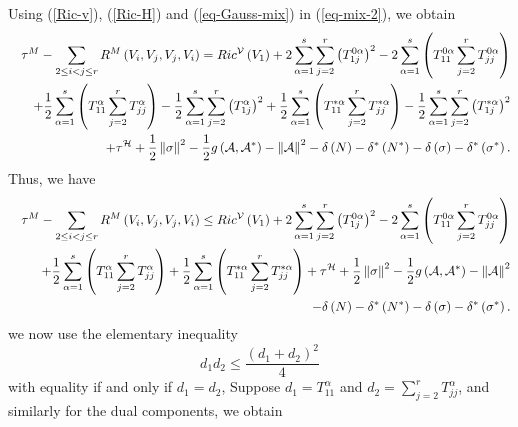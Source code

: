 \documentclass[10pt,a4paper]{article}
\theoremstyle{definition}
\theoremstyle{remark}
\numberwithin{equation}{section}
\begin{document}
Using (\ref{Ric-v}), (\ref{Ric-H}) and (\ref{eq-Gauss-mix}) in (\ref{eq-mix-2}),
we obtain%
\begin{eqnarray}
&&\tau ^{M}-\sum_{2\leq i<j\leq r}R^{M}\left( V_{i},V_{j},V_{j},V_{i}\right)
=Ric^{{\cal V}}\left( V_{1}\right) +2\sum_{\alpha
=1}^{s}\sum_{j=2}^{r}\left( T_{1j}^{0\alpha }\right) ^{2}-2\sum_{\alpha
=1}^{s}\left( T_{11}^{0\alpha }\sum_{j=2}^{r}T_{jj}^{0\alpha }\right) 
\nonumber \\
&&+\frac{1}{2}\sum_{\alpha =1}^{s}\left( T_{11}^{\alpha
}\sum_{j=2}^{r}T_{jj}^{\alpha }\right) -\frac{1}{2}\sum_{\alpha
=1}^{s}\sum_{j=2}^{r}\left( T_{1j}^{\alpha }\right) ^{2}+\frac{1}{2}%
\sum_{\alpha =1}^{s}\left( T_{11}^{\ast \alpha }\sum_{j=2}^{r}T_{jj}^{\ast
\alpha }\right) -\frac{1}{2}\sum_{\alpha =1}^{s}\sum_{j=2}^{r}\left(
T_{1j}^{\ast \alpha }\right) ^{2}  \nonumber \\
&&+\tau ^{{\cal H}}+\frac{1}{2}\left\Vert \sigma \right\Vert ^{2}-\frac{1}{2}%
g\left( {\cal A},{\cal A}^{\ast }\right) -\left\Vert {\cal A}\right\Vert
^{2}-\delta \left( N\right) -\delta ^{\ast }\left( N^{\ast }\right) -\delta
\left( \sigma \right) -\delta ^{\ast }\left( \sigma ^{\ast }\right) .
\label{eq-mix-3}
\end{eqnarray}%
Thus, we have%
\begin{eqnarray}
&&\tau ^{M}-\sum_{2\leq i<j\leq r}R^{M}\left( V_{i},V_{j},V_{j},V_{i}\right)
\leq Ric^{{\cal V}}\left( V_{1}\right) +2\sum_{\alpha
=1}^{s}\sum_{j=2}^{r}\left( T_{1j}^{0\alpha }\right) ^{2}-2\sum_{\alpha
=1}^{s}\left( T_{11}^{0\alpha }\sum_{j=2}^{r}T_{jj}^{0\alpha }\right) 
\nonumber \\
&&+\frac{1}{2}\sum_{\alpha =1}^{s}\left( T_{11}^{\alpha
}\sum_{j=2}^{r}T_{jj}^{\alpha }\right) +\frac{1}{2}\sum_{\alpha
=1}^{s}\left( T_{11}^{\ast \alpha }\sum_{j=2}^{r}T_{jj}^{\ast \alpha
}\right) +\tau ^{{\cal H}}+\frac{1}{2}\left\Vert \sigma \right\Vert ^{2}-%
\frac{1}{2}g\left( {\cal A},{\cal A}^{\ast }\right) -\left\Vert {\cal A}%
\right\Vert ^{2}  \nonumber \\
&&-\delta \left( N\right) -\delta ^{\ast }\left( N^{\ast }\right) -\delta
\left( \sigma \right) -\delta ^{\ast }\left( \sigma ^{\ast }\right) .
\label{eq-mix-4}
\end{eqnarray}%
we now use the elementary inequality%
\[
d_{1}d_{2}\leq \frac{\left( d_{1}+d_{2}\right) ^{2}}{4} 
\]%
with equality if and only if $d_{1}=d_{2}$, Suppose $d_{1}=T_{11}^{\alpha }$
and $d_{2}=\sum_{j=2}^{r}T_{jj}^{\alpha }$, and similarly for the dual
components, we obtain%
\end{document}
